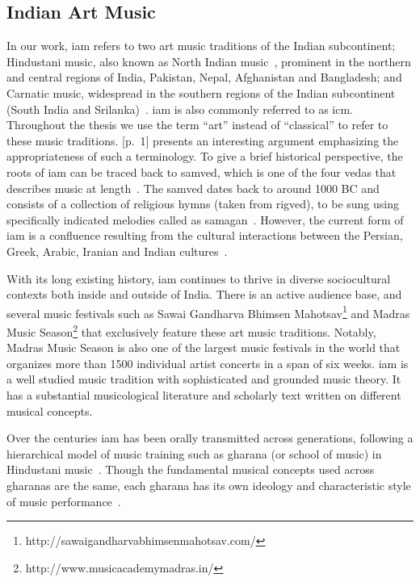 \subsection{Indian Art Music}
\label{sec:music_background_iam}

In our work, \acrfull{iam} refers to two art music traditions of the Indian subcontinent; Hindustani music, also known as North Indian music~\citep{Bor2010, Danielou2010}, prominent in the northern and central regions of India, Pakistan, Nepal, Afghanistan and Bangladesh; and Carnatic music, widespread in the southern regions of the Indian subcontinent (South India and Srilanka)~\citep{Singh1995,Viswanathan2004}. \gls{iam} is also commonly referred to as \gls{icm}. Throughout the thesis we use the term ``art'' instead of ``classical'' to refer to these music traditions. \cite{Raja2012}[p.~1] presents an interesting argument emphasizing the appropriateness of such a terminology. To give a brief historical perspective, the roots of \gls{iam} can be traced back to \gls{samved}, which is one of the four \gls{vedas} that describes music at length~\citep{Trivedi2008,Singh1995}. The \gls{samved} dates back to around 1000 BC and consists of a collection of religious hymns (taken from \gls{rigved}), to be sung using specifically indicated melodies called as \gls{samagan}~\citep{Griffith2004}. However, the current form of \gls{iam} is a confluence resulting from the cultural interactions between the Persian, Greek, Arabic, Iranian and Indian cultures~\citep{Kaul2007,Saraf2011,Singh1995}.

With its long existing history, \gls{iam} continues to thrive in diverse sociocultural contexts both inside and outside of India. There is an active audience base, and several music festivals such as Sawai Gandharva Bhimsen Mahotsav\footnote{http://sawaigandharvabhimsenmahotsav.com/} and Madras Music Season\footnote{http://www.musicacademymadras.in/} that exclusively feature these art music traditions. Notably, Madras Music Season is also one of the largest music festivals in the world that organizes more than 1500 individual artist concerts in a span of six weeks. \Gls{iam} is a well studied music tradition with sophisticated and grounded music theory. It has a substantial musicological literature and scholarly text written on different musical concepts. 

Over the centuries \gls{iam} has been orally transmitted across generations, following a hierarchical model of music training such as \gls{gharana} (or school of music) in Hindustani music~\citep{Saraf2011,Mehta2008}. Though the fundamental musical concepts used across \glspl{gharana} are the same, each \gls{gharana} has its own ideology and characteristic style of music performance~\citep{Deshpande1989}. 

